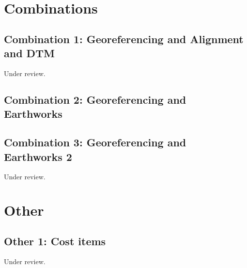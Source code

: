 \documentclass{scrartcl}
\begin{document}
\section{Combinations}

\subsection{Combination 1: Georeferencing and Alignment and DTM}
\label{sec:align_dtm_1}
Under review.%
\clearpage

\subsection{Combination 2: Georeferencing and Earthworks}
\label{sec:georef_earth_1}
\clearpage

\subsection{Combination 3: Georeferencing and Earthworks 2}
\label{sec:georef_earth_2}
Under review.%
\clearpage

\section{Other}

\subsection{Other 1: Cost items}
\label{sec:other_1}
Under review.%
\clearpage
\end{document}
